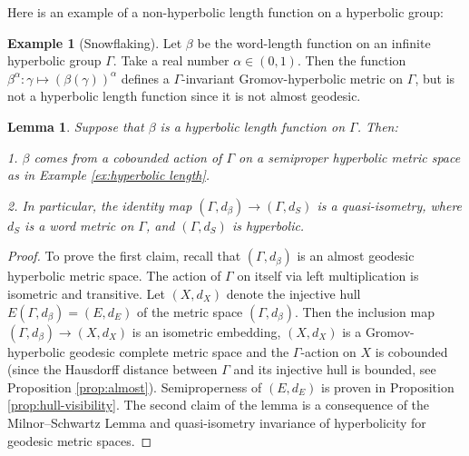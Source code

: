 \documentclass[12pt]{amsbook}%
\newtheorem{lem}[thm]{Lemma}
\theoremstyle{definition}
\newtheorem{example}[thm]{Example}
\newtheorem{question}[thm]{Question}
\theoremstyle{remark}
\numberwithin{section}{chapter}
\numberwithin{subsection}{section}
\numberwithin{figure}{chapter}
\def\Ga{\Gamma}
\def\ga{\gamma}
\def\al{\alpha}
\def\mini{\scriptsize}
\begin{document}
Here is an example of a non-hyperbolic length function on a hyperbolic group:

\begin{example}
[Snowflaking] Let $\beta$ be the word-length function on an infinite hyperbolic group $\Ga$. Take a real number $\al\in (0,1)$. 
Then the function $\beta^\al: \ga\mapsto (\beta(\ga))^{\al}$ defines a $\Ga$-invariant Gromov-hyperbolic metric on $\Ga$, but 
is not a hyperbolic length function since it is not almost geodesic. 
\end{example} 




\begin{lem}\label{lem:regular}
Suppose that $\beta$ is a hyperbolic length function on $\Ga$. Then:

1. $\beta$ comes from  a cobounded action of $\Ga$ on a semiproper hyperbolic metric space as in Example \ref{ex:hyperbolic length}. 

2. In particular, the identity map $(\Ga, d_\beta)\to (\Ga, d_S)$ is a quasi-isometry, where $d_S$ is a word metric on $\Ga$, and  $(\Ga,d_S)$ is hyperbolic. 
\end{lem}
\begin{proof} %
To prove the first claim, recall that $(\Ga, d_\beta)$ is an almost geodesic hyperbolic metric space. The action of $\Ga$ on itself via left multiplication 
is isometric and transitive. Let $(X,d_X)$ denote the injective hull $E(\Ga, d_\beta)=(E,d_E)$ of the metric space $(\Ga, d_\beta)$. Then the inclusion map 
$(\Ga, d_\beta)\to (X,d_X)$ is an isometric embedding, $(X,d_X)$ is a Gromov-hyperbolic geodesic complete metric space and the $\Ga$-action on 
$X$ is cobounded  (since the Hausdorff distance between $\Ga$ and its injective hull is bounded, see Proposition \ref{prop:almost}). Semiproperness of $(E,d_E)$ is proven in Proposition \ref{prop:hull-visibility}. 
The second claim of the lemma is a consequence of the Milnor--Schwartz Lemma and quasi-isometry invariance of hyperbolicity for geodesic metric spaces. 
 \end{proof}
\end{document}
